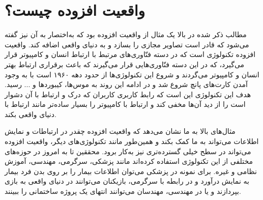 \section{واقعیت افزوده چیست؟}
مطالب ذکر شده در بالا ‌یک مثال از واقعیت افزوده بود  که به‌اختصار به آن  نیز گفته می‌شود که قادر است تصاویر مجازی را بسازد و به دنیای واقعی اضافه کند. واقعیت افزوده تکنولوژی است که در دسته فنّاوری‌های مرتبط با ارتباط انسان و کامپیوتر  قرار می‌گیرد، که در این دسته فنّاوری‌هایی قرار می‌گیرند که باعث برقراری ارتباط  بهتر انسان و کامپیوتر می‌گردند و شروع این تکنولوژی‌ها از حدود دهه ۱۹۶۰ است با به وجود آمدن کارت‌های پانچ شروع شد و در ادامه این روند به موس‌ها، کیبوردها و ... رسید. هدف این تکنولوژی این است که رابط کاربری  کاربران که درک و ارتباط با آن دشوار است را از دید آن‌ها مخفی کند و ارتباط با کامپیوتر را بسیار ساده‌تر مانند ارتباط با دنیای واقعی بکند.

مثال‌های بالا به ما نشان می‌دهد که واقعیت افزوده چقدر در ارتباطات و نمایش اطلاعات می‌تواند به ما کمک بکند و همین‌طور مانند تکنولوژی‌های دیگر، واقعیت افزوده می‌تواند در سطح خیلی گسترده‌تری نیز به‌کار برود. محققین تا به امروز در حوزه‌های مختلفی از این تکنولوژی استفاده کرده‌اند مانند پزشکی، سرگرمی، مهندسی، آموزش نظامی و غیره. برای نمونه در پزشکی می‌توان اطلاعات بیمار را بر روی بدن فرد بیمار به نمایش درآورد \cite{nasir}و در رابطه با سرگرمی، بازیکنان می‌توانند در دنیای واقعی به بازی بپردازند \cite{serino2016pokemon}و یا در مهندسی، مهندسان می‌توانند انتهای یک پروژه ساختمانی را ببینند\cite{Fjeld}.



